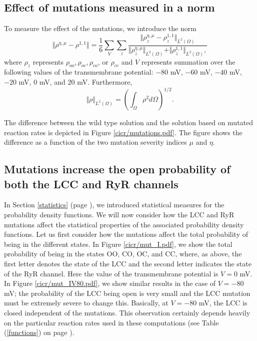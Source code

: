  

\subsection{Effect of mutations measured in a norm}

To
measure the effect of the mutations, we introduce the norm
\begin{equation}
\Vert \rho^{\eta,\mu}-\rho^{1,1}\Vert=\frac{1}{6}\sum_{V} \sum_{z}\frac{\Vert\rho_z^{\eta,\mu}-\rho_z^{1,1}\Vert_{L^{2}\left(  \Omega\right)  }}{\Vert\rho_z^{\eta,\mu}\Vert_{L^{2}\left(  \Omega\right)}+\Vert\rho_z^{1,1}\Vert_{L^{2}\left(  \Omega\right)}, \label{norm44}}
\end{equation}
where $\rho_z$ represents $\rho_{oo}$,$\, \rho_{oc}$,$\, \rho_{co}$, or
$\rho_{cc}$ and $V$ represents summation over the following values of the transmembrane potential: $-80$ mV, $-60$ mV, $-40$ mV, $-20$ mV, $0$ mV, and $20$ mV. Furthermore, %
\begin{equation}
\Vert\rho\Vert_{L^{2}\left(  \Omega\right)  }=\left(\int_{\Omega}\rho^2 d\Omega\right) ^{1/2}. \label{norm_rho}
\end{equation}


The difference between the wild type solution and the solution based on
mutated reaction rates is depicted in Figure \ref{cicr/mutations.pdf}. 
The figure shows the difference as a function of the two mutation severity indices $\mu$ and $\eta$. 





\subsection{Mutations increase the open probability of both the LCC and RyR channels}

In Section \ref{statistics} (page \pageref{statistics}), we introduced statistical measures for the probability density functions. We will now consider how the LCC and RyR mutations affect the statistical properties of the associated probability density functions. Let us first consider how the mutations affect the total probability of being in the different states. In Figure \ref{cicr/mut_I.pdf}, we show the total probability of being in the states OO, CO, OC, and CC, where, as above, the first letter denotes the state of the LCC and the second letter indicates the state of the RyR channel. Here the value of the transmembrane potential is $V=0$ mV. 
In  Figure \ref{cicr/mut_IV80.pdf}, we show similar results in the case of $V=-80$ mV; the probability of the LCC being open is very small and the LCC mutation must be extremely severe to change this. Basically, at $V=-80$ mV, the LCC is closed independent of the mutations. This observation certainly depends heavily on the particular reaction rates used in these computations (see Table (\ref{functions}) on page \pageref{functions}).



